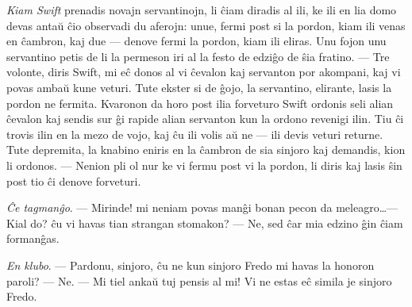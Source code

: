 \emph{Kiam Swift} prenadis novajn servantinojn, li \^ciam diradis al
ili, ke ili en lia domo devas anta\u u \^cio observadi du aferojn:
unue, fermi post si la pordon, kiam ili venas en \^cambron, kaj due
--- denove fermi la pordon, kiam ili eliras. Unu fojon unu servantino
petis de li la permeson iri al la festo de edzi\^go de \^sia
fratino. --- Tre volonte, diris Swift, mi e\^c donos al vi \^cevalon
kaj servanton por akompani, kaj vi povas amba\u u kune veturi. Tute
ekster si de \^gojo, la servantino, elirante, lasis la pordon ne
fermita. Kvaronon da horo post ilia forveturo Swift ordonis seli
alian \^cevalon kaj sendis sur \^gi rapide alian servanton kun la
ordono revenigi ilin. Tiu \^ci trovis ilin en la mezo de vojo, kaj
\^cu ili volis a\u u ne --- ili devis veturi returne. Tute
depremita, la knabino eniris en la \^cambron de sia sinjoro kaj
demandis, kion li ordonos. --- Nenion pli ol nur ke vi fermu post vi
la pordon, li diris kaj lasis \^sin post tio \^ci denove forveturi.

\emph{\^Ce tagman\^go}. --- Mirinde! mi neniam povas man\^gi bonan
pecon da meleagro\dots --- Kial do? \^cu vi havas tian strangan
stomakon? --- Ne, sed \^car mia edzino \^gin \^ciam forman\^gas.

\emph{En klubo}. --- Pardonu, sinjoro, \^cu ne kun sinjoro Fredo mi
havas la honoron paroli? --- Ne. --- Mi tiel anka\u u tuj pensis al
mi! Vi ne estas e\^c simila je sinjoro Fredo.


